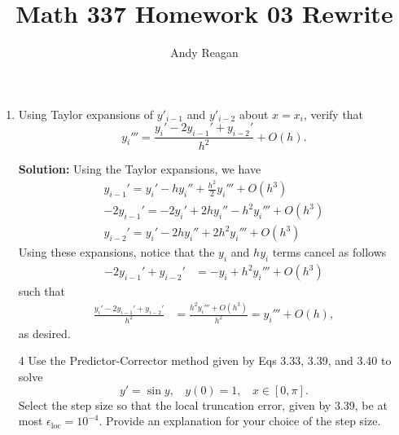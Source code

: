 \documentclass[11pt]{article}
\author{Andy Reagan}
\title{Math 337 Homework 03 Rewrite}
\def\f{\frac }
\begin{document}
\maketitle

\begin{enumerate}

\item Using Taylor expansions of $y'_{i-1}$ and $y'_{i-2}$ about $x = x_i$, verify that
\[ y_i ''' = \f{y_i'-2y_{i-1}'+y_{i-2}'}{h^2} + O(h) . \]

\bigskip
\textbf{Solution:} Using the Taylor expansions, we have 
\begin{align} y_{i-1} ' = y_i ' - h y_i '' + \f{h^2}{2} y_i ''' + O(h^3) \\
-2 y_{i-1} ' = -2 y_i ' + 2 h y_i '' - h^2 y_i ''' + O(h^3) \\
y_{i-2} ' = y_i ' - 2 h y_i '' + 2 h^2y_i ''' + O(h^3) \end{align}
Using these expansions, notice that the $y_i$ and $hy_i$ terms cancel as follows
\begin{align} -2y_{i-1}'+y_{i-2}' &= -y_i + h^2 y_i''' + O(h^3)\end{align}
such that
\begin{align} \f{y_i'-2y_{i-1}'+y_{i-2}'}{h^2} &= \f{h^2y_i'''+O(h^3)}{h^2} = y_i''' + O(h), \end{align}
as desired.
\item[4] Use the Predictor-Corrector method given by Eqs 3.33, 3.39, and 3.40 to solve
\begin{equation} y' = \sin y, ~~~~ y(0) = 1, ~~~~ x \in [0, \pi ] . \end{equation}
Select the step size so that the local truncation error, given by 3.39, be at most $\epsilon _{\text{loc}} = 10^{-4}$.
Provide an  explanation for your choice of the step size.


\end{enumerate}
\end{document}
